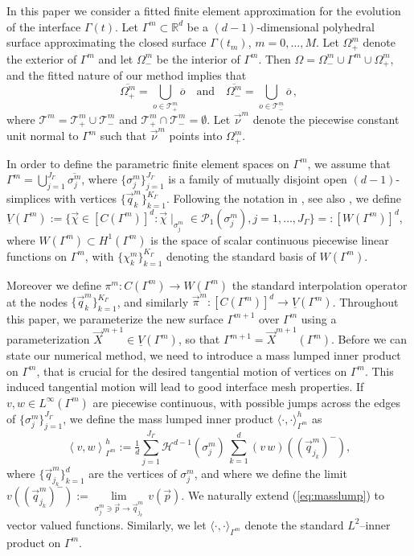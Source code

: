\documentclass[a4paper,11pt,onecolumn]{article}
\newcommand{\R}{{\mathbb R}}
\newcommand{\Vh}{\underline{V}(\Gamma^m)}
\newcommand{\Wh}{W(\Gamma^m)}
\begin{document}
In this paper we consider a fitted finite element approximation for the
evolution of the interface $\Gamma(t)$. Let $\Gamma^{m}\subset\R^d$ be a
$(d-1)$-dimensional polyhedral surface approximating the closed surface
$\Gamma(t_m)$, $m=0 ,\ldots, M$. Let $\Omega^m_+$ denote the exterior of
$\Gamma^m$ and let $\Omega^m_-$ be the interior of $\Gamma^m$. Then
$\Omega = \Omega_-^m \cup \Gamma^m \cup \Omega_+^m$, and the fitted nature of
our method implies that
\begin{equation} \label{eq:fittedO}
\overline{\Omega^m_+} = \bigcup_{o \in \mathcal{T}^m_+} \overline{o}
\quad\text{and}\quad
\overline{\Omega^m_-} = \bigcup_{o \in \mathcal{T}^m_-} \overline{o} \,,
\end{equation}
where $\mathcal{T}^m = \mathcal{T}^m_+ \cup \mathcal{T}^m_-$ and
$\mathcal{T}^m_+ \cap \mathcal{T}^m_- = \emptyset$.
Let $\vec{\nu}^m$ denote the piecewise constant unit normal to $\Gamma^m$
such that $\vec\nu^m$ points into $\Omega^m_+$.

In order to define the parametric finite element spaces on $\Gamma^m$, we
assume that $\Gamma^m=\bigcup_{j=1}^{J_\Gamma} \overline{\sigma^m_j}$, where
$\{\sigma^m_j\}_{j=1}^{J_\Gamma}$ is a family of mutually disjoint open
$(d-1)$-simplices with vertices $\{\vec{q}^m_k\}_{k=1}^{K_\Gamma}$. Following
the notation in \cite{spurious}, see also \cite{gflows3d}, we define
$\Vh := \{\vec\chi \in [C(\Gamma^m)]^d:\vec\chi\!\mid_{\sigma^m_j}
\in \mathcal{P}_1(\sigma^m_j), j=1,\ldots, J_\Gamma\} =: [\Wh]^d$,
where $\Wh \subset H^1(\Gamma^m)$ is the space of scalar continuous
piecewise linear functions on $\Gamma^m$, with $\{\chi^m_k\}_{k=1}^{K_\Gamma}$
denoting the standard basis of $\Wh$.

Moreover we define $\pi^m: C(\Gamma^m)\to \Wh$ the standard interpolation
operator at the nodes $\{\vec{q}_k^m\}_{k=1}^{K_\Gamma}$, and similarly
$\vec\pi^m: [C(\Gamma^m)]^d\to \Vh$. Throughout this paper, we parameterize
the new surface $\Gamma^{m+1}$ over $\Gamma^m$ using a parameterization
$\vec{X}^{m+1} \in \Vh$, so that $\Gamma^{m+1} = \vec{X}^{m+1}(\Gamma^m)$.
Before we can state our numerical method, we need to introduce a mass lumped
inner product on $\Gamma^m$, that is crucial for the desired tangential motion
of vertices on $\Gamma^m$. This induced tangential motion
will lead to good interface mesh properties.
If $v,w \in L^\infty(\Gamma^m)$ are piecewise continuous, with possible jumps
across the edges of $\{\sigma_j^m\}_{j=1}^{J_\Gamma}$, we define the mass
lumped inner product $\langle\cdot,\cdot\rangle_{\Gamma^m}^h$ as
\begin{equation} \label{eq:masslump}
\left\langle v, w \right\rangle^h_{\Gamma^m} :=
\tfrac1d \sum_{j=1}^{J_\Gamma} \mathcal{H}^{d-1}(\sigma^m_j)\,
\sum_{k=1}^{d} (v\,w)((\vec{q}^m_{j_k})^-),
\end{equation}
where $\{\vec{q}^m_{j_k}\}_{k=1}^{d}$ are the vertices of $\sigma^m_j$, and
where we define the limit $v((\vec{q}^m_{j_k})^-)
:= \underset{\sigma^m_j\ni \vec{p}\to \vec{q}^m_{j_k}}{\lim}\, v(\vec{p})$. We
naturally extend (\ref{eq:masslump}) to vector valued functions. Similarly, we
let $\langle\cdot,\cdot\rangle_{\Gamma^m}$ denote the standard $L^2$--inner
product on $\Gamma^m$.
\end{document}
